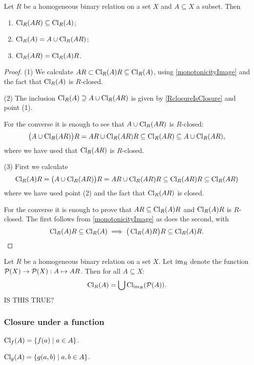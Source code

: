 \begin{lemma}
Let $R$ be a homogeneous binary relation on a set $X$ and $A\subseteq X$ a subset. Then
\begin{enumerate}
\item $\operatorname{Cl}_R(AR) \subseteq \operatorname{Cl}_R(A)$;
\item $\operatorname{Cl}_R(A) = A \cup \operatorname{Cl}_R(AR)$;
\item $\operatorname{Cl}_R(AR) = \operatorname{Cl}_R(A)R$.
\end{enumerate}
\end{lemma}
\begin{proof}
(1) We calculate $AR \subset \operatorname{Cl}_R(A)R \subseteq \operatorname{Cl}_R(A)$, using \ref{monotonicityImage} and the fact that $\operatorname{Cl}_R(A)$ is $R$-closed.

(2) The inclusion $\operatorname{Cl}_R(A) \supseteq A \cup \operatorname{Cl}_R(AR)$ is given by \ref{RclosureIsClosure} and point (1).

For the converse it is enough to see that $A \cup \operatorname{Cl}_R(AR)$ is $R$-closed:
\[ \big(A \cup \operatorname{Cl}_R(AR)\big)R = AR \cup \operatorname{Cl}_R(AR)R \subseteq \operatorname{Cl}_R(AR) \subseteq A \cup \operatorname{Cl}_R(AR), \]
where we have used that $\operatorname{Cl}_R(AR)$ is $R$-closed.

(3) First we calculate
\[ \operatorname{Cl}_R(A)R = \big(A \cup \operatorname{Cl}_R(AR)\big)R = AR \cup \operatorname{Cl}_R(AR)R \subseteq \operatorname{Cl}_R(AR)R \subseteq \operatorname{Cl}_R(AR) \]
where we have used point (2) and the fact that $\operatorname{Cl}_R(AR)$ is closed.

For the converse it is enough to prove that $AR \subseteq \operatorname{Cl}_R(A)R$ and $\operatorname{Cl}_R(A)R$ is $R$-closed. The first follows from \ref{monotonicityImage} as does the second, with
\[ \operatorname{Cl}_R(A)R \subseteq \operatorname{Cl}_R(A) \implies \big(\operatorname{Cl}_R(A)R\big)R \subseteq \operatorname{Cl}_R(A)R. \]
\end{proof}

\begin{lemma}
Let $R$ be a homogeneous binary relation on a set $X$. Let $\operatorname{im}_R$ denote the function $\operatorname{\mathcal{P}}(X) \to \operatorname{\mathcal{P}}(X): A \mapsto AR$. Then for all $A\subseteq X$:
\[ \operatorname{Cl}_R(A) = \bigcup \operatorname{Cl}_{\operatorname{im}_R}(\operatorname{\mathcal{P}}(A)). \]
IS THIS TRUE?
\end{lemma}


\subsubsection{Closure under a function}

\begin{lemma}
$\Closure_f(A) = \setbuilder{f(a)}{a\in A}$.

$\Closure_g(A) = \setbuilder{g(a,b)}{a,b\in A}$.
\end{lemma}

